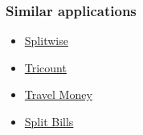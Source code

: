 \documentclass[11pt]{beamer}
\begin{document}
	\begin{frame}
		\frametitle{Similar applications}
		
		\begin{itemize}
			\item \href{https://play.google.com/store/apps/details?id=com.Splitwise.SplitwiseMobile&hl=en_US&gl=US}{Splitwise}
			\item \href{https://play.google.com/store/apps/details?id=com.tribab.tricount.android}{Tricount}
			\item \href{https://play.google.com/store/apps/details?id=org.marbot.travel.money.free}{Travel Money}
			\item \href{https://play.google.com/store/apps/details?id=com.jwang123.splitbills}{Split Bills}
		\end{itemize}
	\end{frame}
\end{document}
